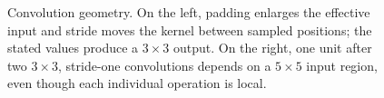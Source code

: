 {\begin{figure}[htbp]
\caption{Convolution geometry. On the left, padding enlarges the effective input and stride moves the kernel between sampled positions; the stated values produce a $3\times3$ output. On the right, one unit after two $3\times3$, stride-one convolutions depends on a $5\times5$ input region, even though each individual operation is local.}
\label{fig:convolution-geometry}
\end{figure}}

